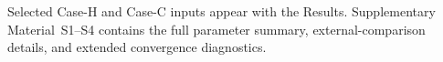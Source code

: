 \begin{table}[!tbp]
\centering
\caption{Numerical consistency checks for the Bloch finite-element implementation.}
\label{tab:consistency_suite}

\end{table}

Selected Case-H and Case-C inputs appear with the Results. Supplementary Material~S1--S4 contains the full parameter summary, external-comparison details, and extended convergence diagnostics.
